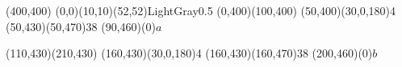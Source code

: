 \documentclass[a4paper]{article}
\begin{document}
\begin{center}
    \begin{axopicture}(400,400)
        \AxoGrid(0,0)(10,10)(52,52){LightGray}{0.5}
        \Line[arrow,arrowpos=0.5,arrowlength=6,arrowwidth=3,arrowinset=0.1](0,400)(100,400)
        \DashArc(50,400)(30,0,180){4}
        \Photon(50,430)(50,470){3}{8}
        \Text(90,460)(0){$a$}

        \Line[arrow,arrowpos=0.5,arrowlength=6,arrowwidth=3,arrowinset=0.1](110,430)(210,430)
        \DashArc(160,430)(30,0,180){4}
        \Photon(160,430)(160,470){3}{8}
        \Text(200,460)(0){$b$}

\end{axopicture}
\end{center}
\end{document}
